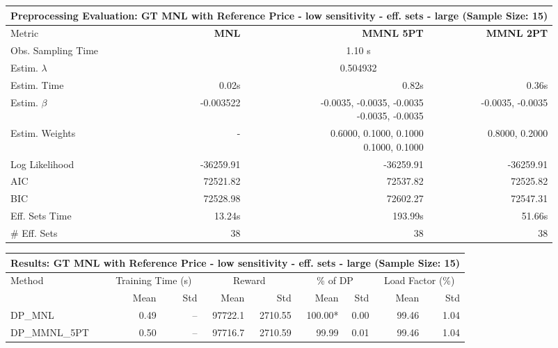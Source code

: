 
\begin{samepage}
\begin{center}
  \small
  \begin{tabular}{l|r|r|r}
    \toprule
    \multicolumn{4}{c}{\textbf{Preprocessing Evaluation: GT MNL with Reference Price - low sensitivity - eff. sets - large (Sample Size: 15)}} \\
    \midrule
    Metric & \textbf{MNL} & \textbf{MMNL 5PT} & \textbf{MMNL 2PT} \\
    \midrule
    Obs. Sampling Time & \multicolumn{3}{c}{1.10 s} \\
    Estim. $\lambda$ & \multicolumn{3}{c}{0.504932} \\
    Estim. Time & 0.02s & 0.82s & 0.36s \\
    Estim. $\beta$ & -0.003522 & \makecell[tr]{-0.0035, -0.0035, -0.0035 \\ -0.0035, -0.0035} & -0.0035, -0.0035 \\
    Estim. Weights & - & \makecell[tr]{0.6000, 0.1000, 0.1000 \\ 0.1000, 0.1000} & 0.8000, 0.2000 \\
    Log Likelihood & -36259.91 & -36259.91 & -36259.91 \\
    AIC & 72521.82 & 72537.82 & 72525.82 \\
    BIC & 72528.98 & 72602.27 & 72547.31 \\
    Eff. Sets Time & 13.24s & 193.99s & 51.66s \\
    \# Eff. Sets & 38 & 38 & 38 \\
    \bottomrule
  \end{tabular}
\end{center}
\begin{center}
  \small
  \begin{tabular}{l|rr|rr|rr|rr}
    \toprule
    \multicolumn{9}{c}{\textbf{Results: GT MNL with Reference Price - low sensitivity - eff. sets - large (Sample Size: 15)}} \\
    \midrule
    Method & \multicolumn{2}{c|}{Training Time (s)} & \multicolumn{2}{c|}{Reward} & \multicolumn{2}{c|}{\% of DP} & \multicolumn{2}{c}{Load Factor (\%)} \\
    & Mean & Std & Mean & Std & Mean & Std & Mean & Std \\
    \midrule
    DP\_MNL      &     0.49 &    -- &    97722.1 &    2710.55 & 100.00* &    0.00 &   99.46 &    1.04 \\
    DP\_MMNL\_5PT &     0.50 &    -- &    97716.7 &    2710.59 &   99.99 &    0.01 &   99.46 &    1.04 \\

\end{tabular}
\end{center}
\end{samepage}
